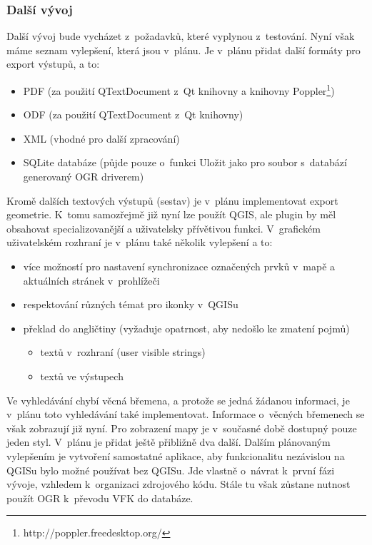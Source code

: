 \documentclass[a4paper,10pt]{article}
\begin{document}
\subsubsection{Další vývoj}
Další vývoj bude vycházet z~požadavků, které vyplynou z~testování. Nyní však máme seznam vylepšení, která jsou v~plánu. Je v~plánu přidat další formáty pro export výstupů, a to:
\begin{itemize}
\item PDF (za použití QTextDocument z~Qt knihovny a knihovny Poppler\footnote{http://poppler.freedesktop.org/})
\item ODF (za použití QTextDocument z~Qt knihovny)
\item XML (vhodné pro další zpracování)
\item SQLite databáze (půjde pouze o~funkci Uložit jako pro soubor s~databází generovaný OGR driverem)
\end{itemize}
Kromě dalších textových výstupů (sestav) je v~plánu implementovat export geometrie.
K~tomu samozřejmě již nyní lze použít QGIS, ale plugin by měl obsahovat specializovanější a uživatelsky přívětivou funkci.
V~grafickém uživatelském rozhraní je v~plánu také několik vylepšení a to:
\begin{itemize}
\item více možností pro nastavení synchronizace označených prvků v~mapě a aktuálních stránek v~prohlížeči
\item respektování různých témat pro ikonky v~QGISu
\item překlad do angličtiny (vyžaduje opatrnost, aby nedošlo ke zmatení pojmů)
    \begin{itemize}
    \item textů v~rozhraní (user visible strings)
    \item textů ve výstupech
    \end{itemize}
\end{itemize}
Ve vyhledávání chybí věcná břemena, a protože se jedná žádanou informaci, je v~plánu toto vyhledávání také implementovat.
Informace o~věcných břemenech se však zobrazují již nyní.
Pro zobrazení mapy je v~současné době dostupný pouze jeden styl.
V~plánu je přidat ještě přibližně dva další.
Dalším plánovaným vylepšením je vytvoření samostatné aplikace, aby funkcionalitu nezávislou na QGISu bylo možné používat bez QGISu.
Jde vlastně o~návrat k~první fázi vývoje, vzhledem k~organizaci zdrojového kódu.
Stále tu však zůstane nutnost použít OGR k~převodu VFK do databáze.
\end{document}
